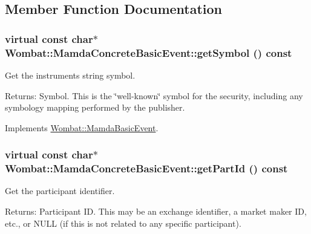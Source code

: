 \subsection{Member Function Documentation}
\hypertarget{classWombat_1_1MamdaConcreteBasicEvent_780ca0833332b5807a30a886e05783a6}{
\subsubsection[getSymbol]{\setlength{\rightskip}{0pt plus 5cm}virtual const char$\ast$ Wombat::Mamda\-Concrete\-Basic\-Event::get\-Symbol () const}}
\label{classWombat_1_1MamdaConcreteBasicEvent_780ca0833332b5807a30a886e05783a6}


Get the instruments string symbol. 

\begin{Desc}
\item[Returns:]Symbol. This is the \char`\"{}well-known\char`\"{} symbol for the security, including any symbology mapping performed by the publisher. \end{Desc}


Implements \hyperlink{classWombat_1_1MamdaBasicEvent_8783b136a1305d21c578ced8618c090b}{Wombat::Mamda\-Basic\-Event}.\hypertarget{classWombat_1_1MamdaConcreteBasicEvent_78269392b05726fb1a17ca054beffcdf}{
\subsubsection[getPartId]{\setlength{\rightskip}{0pt plus 5cm}virtual const char$\ast$ Wombat::Mamda\-Concrete\-Basic\-Event::get\-Part\-Id () const}}
\label{classWombat_1_1MamdaConcreteBasicEvent_78269392b05726fb1a17ca054beffcdf}


Get the participant identifier. 

\begin{Desc}
\item[Returns:]Participant ID. This may be an exchange identifier, a market maker ID, etc., or NULL (if this is not related to any specific participant). \end{Desc}



